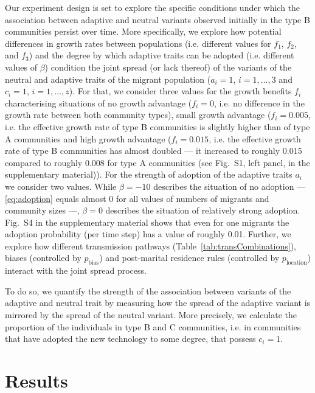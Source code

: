 \documentclass[9pt,twocolumn,twoside,lineno]{pnas-new}
\begin{document}
Our experiment design is set to explore the specific conditions under which the association between adaptive and neutral variants observed initially in the type B communities persist over time. 
More specifically, we explore how potential differences in growth rates between populations (i.e. different values for $f_1$, $f_2$, and $f_3$) and the degree by which adaptive traits can be adopted (i.e. different values of $\beta$) condition the joint spread (or lack thereof) of the variants of the neutral and adaptive traits of the migrant population ($a_i=1$, $i=1,\ldots,3$ and $c_i=1$, $i=1,\ldots,z$). 
{\color{red}For that, we consider three values for the growth benefits $f_i$ characterising situations of no growth advantage ($f_i=0$, i.e. no difference in the growth rate between both community types), small growth advantage ($f_i=0.005$, i.e. the effective growth rate of type B communities is slightly higher than of type A communities and high growth advantage ($f_i=0.015$, i.e. the effective growth rate of type B communities has almost doubled --- it increased to roughly 0.015 compared to roughly 0.008 for type A communities  (see Fig.~S1, left panel, in the supplementary material)). For the strength of adoption of the adaptive traits $a_i$ we consider two values. While $\beta=-10$ describes the situation of no adoption --- \eqref{eq:adoption} equals almost 0 for all values of numbers of migrants and community sizes ---, $\beta=0$ describes the situation of relatively strong adoption. Fig.~S4 in the supplementary material shows that even for one migrants the adoption probability (per time step) has a value of roughly 0.01. }  
Further, we explore  how different transmission pathways (Table~\ref{tab:transCombinations}), biases (controlled by $p_\text{bias}$) and post-marital residence rules (controlled by $p_\text{location}$) interact with the joint spread process.

To do so, we quantify the strength of the association between variants of the adaptive and neutral trait by measuring how the spread of the adaptive variant is mirrored by the spread of the neutral variant. More precisely, we calculate %
the proportion of the individuals in type B and C communities, i.e. in communities that have adopted the new technology to some degree, that possess $c_i=1$. 

\section*{{\color{red}Results}}
\end{document}
